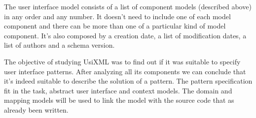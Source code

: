 The user interface model consists of a list of component models (described above) in any order and any number. It doesn't need to include one of each model component and there can be more than one of a particular kind of model component. It's also composed by a creation date, a list of modification dates, a list of authors and a schema version.

The objective of studying UsiXML was to find out if it was suitable to specify user interface patterns. After analyzing all its components we can conclude that it's indeed suitable to describe the solution of a pattern. The pattern specification fit in the task, abstract user interface and context models. The domain and mapping models will be used to link the model with the source code that as already been written.


